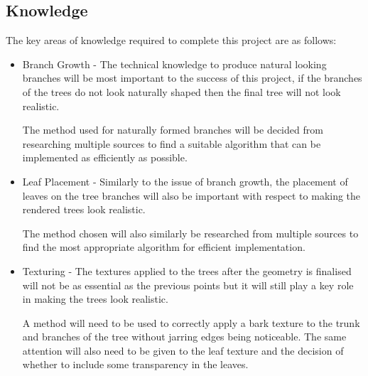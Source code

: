 \documentclass[review]{cmpreport}
\begin{document}
\subsection{Knowledge}
The key areas of knowledge required to complete this project are as follows:
\begin{itemize}
        \item Branch Growth - The technical knowledge to produce natural looking 
              branches will be most important to the success of this project, 
              if the branches of the trees do not look naturally shaped then 
              the final tree will not look realistic. \par
              The method used for naturally formed branches will be decided from 
              researching multiple sources to find a suitable algorithm that 
              can be implemented as efficiently as possible.
        \item Leaf Placement - Similarly to the issue of branch growth, the 
              placement of leaves on the tree branches will also be important 
              with respect to making the rendered trees look realistic. \par 
              The method chosen will also similarly be researched from multiple 
              sources to find the most appropriate algorithm for efficient 
              implementation.
        \item Texturing - The textures applied to the trees after the geometry 
              is finalised will not be as essential as the previous points but 
              it will still play a key role in making the trees look realistic.
              \par A method will need to be used to correctly apply a bark 
              texture to the trunk and branches of the tree without jarring 
              edges being noticeable. The same attention will also need to be 
              given to the leaf texture and the decision of whether to include 
              some transparency in the leaves.
\end{itemize}
\end{document}

